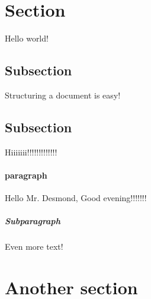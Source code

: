\documentclass{article}
\begin{document}
	\section{Section}
	Hello world!
	\subsection{Subsection}
	Structuring a document is easy!
	\subsection{Subsection}
	Hiiiiiii!!!!!!!!!!!!!
	\paragraph{paragraph}
	Hello Mr. Desmond, Good evening!!!!!!!
	\subparagraph{Subparagraph}
	Even more text!
	\section{Another section}
\end{document}
